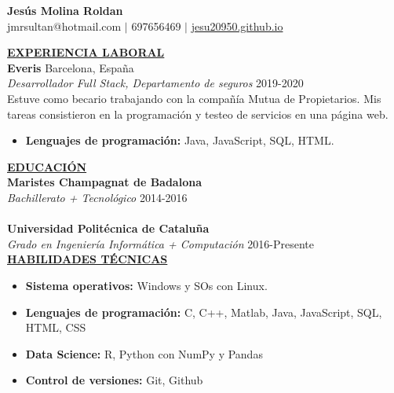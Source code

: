 \documentclass{article}
\begin{document}
	\begin{center}
		\thispagestyle{empty}
		\large \textbf{Jesús Molina Roldan\\}
		\normalsize jmr\textunderscore sultan@hotmail.com $\mid$ 697656469 $\mid$ \href{https://jesu20950.github.io/}{jesu20950.github.io} \\ 
		\hrulefill
	\end{center}
	
	\noindent \textbf{\underline{EXPERIENCIA LABORAL}} \\
	\noindent \textbf{Everis} \hfill Barcelona, España \\
	\textit{Desarrollador Full Stack, Departamento de seguros} \hfill 2019-2020 \\
	Estuve como becario trabajando con la compañía Mutua de Propietarios. Mis tareas consistieron en la programación y testeo de servicios en una página web.
	\begin{itemize}[noitemsep,nolistsep,leftmargin=*]
		\item {\textbf{Lenguajes de programación:} Java, JavaScript, SQL, HTML.}\\
	\end{itemize}
	

	\noindent \textbf{\underline{EDUCACIÓN}} \\
	\textbf{Maristes Champagnat de Badalona} \\
	\textit{Bachillerato + Tecnológico}  \hfill 2014-2016  \\ \\
	\textbf{Universidad Politécnica de Cataluña} \\
	\textit{Grado en Ingeniería Informática + Computación}  \hfill 2016-Presente \\
	

	\noindent \textbf{\underline{HABILIDADES TÉCNICAS}} \\
	\begin{itemize}[noitemsep,nolistsep,leftmargin=*]
		\item {\textbf{Sistema operativos:} Windows y SOs con Linux.}
		\item {\textbf{Lenguajes de programación:} C, C++, Matlab, Java, JavaScript, SQL, HTML, CSS}
		\item {\textbf{Data Science:} R, Python con NumPy y Pandas}
		\item {\textbf{Control de versiones:} Git, Github}\\
	\end{itemize}
	
\end{document}
